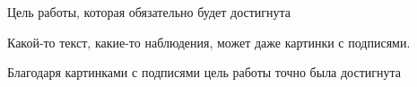 
Цель работы, которая обязательно будет достигнута


Какой-то текст, какие-то наблюдения, может даже картинки с подписями.


Благодаря картинками с подписями цель работы точно была достигнута
